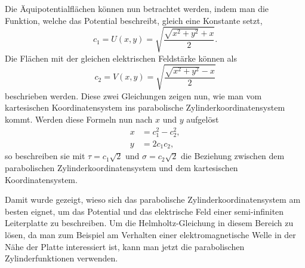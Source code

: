Die Äquipotentialflächen können nun betrachtet werden, 
indem man die Funktion, welche das Potential beschreibt, gleich eine Konstante setzt,
\begin{equation}
	c_1 = U(x,y) = \sqrt{\frac{\sqrt{x^2+y^2} + x}{2}}.
\end{equation}
Die Flächen mit der gleichen elektrischen Feldstärke können als
\begin{equation}
	c_2 = V(x,y) = \sqrt{\frac{\sqrt{x^2+y^2} - x}{2}}
\end{equation}
beschrieben werden. Diese zwei Gleichungen zeigen nun, wie man vom 
kartesischen Koordinatensystem ins parabolische Zylinderkoordinatensystem kommt.
Werden diese Formeln nun nach $x$ und $y$ aufgelöst 
\begin{align}
	x &=  c_1^2 - c_2^2 ,\\
	y &= 2c_1 c_2,
\end{align}
so beschreiben sie mit $\tau = c_1 \sqrt{2}$ und $\sigma = c_2 \sqrt{2}$ die Beziehung 
zwischen dem parabolischen Zylinderkoordinatensystem und dem kartesischen Koordinatensystem.

Damit wurde gezeigt, wieso sich das parabolische Zylinderkoordinatensystem am besten eignet, um 
das Potential und das elektrische Feld einer semi-infiniten Leiterplatte zu beschreiben.
Um die Helmholtz-Gleichung in diesem Bereich zu lösen, 
da man zum Beispiel am Verhalten einer elektromagnetische Welle in der Nähe 
der Platte interessiert ist, kann man jetzt die parabolischen Zylinderfunktionen verwenden. 

